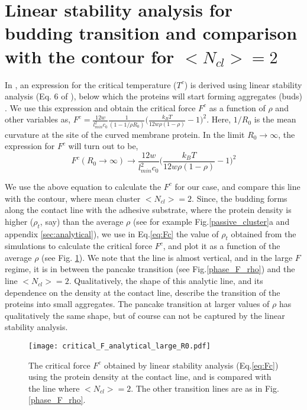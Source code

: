 \documentclass[pre,amsmath]{revtex4}
\begin{document}
\section{Linear stability analysis for budding transition and comparison with the contour for $<N_{cl}> = 2$}
\label{sec:Ncl2line}
In \cite{miha2019}, an expression for the critical temperature ($T^c$) is derived using linear stability analysis (Eq. 6 of \cite{miha2019}), below which the proteins will start forming aggregates (buds) \cite{Gladnikoff2009}. We use this expression and obtain the critical force $F^c$ as a function of $\rho$ and other variables as, $F^c = \frac{12 w}{l^2_{min} c_0} \frac{1}{(1-1/\rho R_0)} \Big(\frac{k_B T}{12 w \rho (1-\rho)} -1\Big)^2$. Here, $1/R_0$ is the mean curvature at the site of the curved membrane protein. In the limit $R_0 \rightarrow \infty$, the expression for $F^c$ will turn out to be,
\begin{equation}
F^c (R_0 \rightarrow \infty) \rightarrow \frac{12 w}{l^2_{min} c_0} \Big(\frac{k_B T}{12 w \rho (1-\rho)} -1\Big)^2
\label{eq:Fc}
\end{equation}

We use the above equation to calculate the $F^c$ for our case, and compare this line with the contour, where mean cluster $<N_{cl}> = 2$. Since, the budding forms along the contact line with the adhesive substrate, where the protein density is higher ($\rho_t$, say) than the average $\rho$ (see for example Fig.\ref{passive_cluster}a and appendix \ref{sec:analytical}), we use in Eq.\ref{eq:Fc} the value of $\rho_t$ obtained from the simulations to calculate the critical force $F^c$, and plot it as a function of the average $\rho$ (see Fig. \ref{Fc_linear_stability}). We note that the line is almost vertical, and in the large $F$ regime, it is in between the pancake transition (see Fig.\ref{phase_F_rho}) and the line $<N_{cl}> = 2$. Qualitatively, the shape of this analytic line, and its dependence on the density at the contact line, describe the transition of the proteins into small aggregates. The pancake transition at larger values of $\rho$ has qualitatively the same shape, but of course can not be captured by the linear stability analysis.

\begin{figure}[ht]
\centering
\texttt{[image: critical\_F\_analytical\_large\_R0.pdf]}
\caption{The critical force  $F^c$ obtained by linear stability analysis (Eq.\ref{eq:Fc}) using the protein density at the contact line, and is compared with the line where $<N_{cl}>=2$. The other transition lines are as in Fig.\ref{phase_F_rho}.}
\label{Fc_linear_stability} 
\end{figure}
\end{document}
